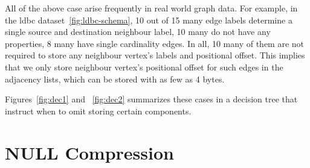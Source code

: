 All of the above case arise frequently in real world graph data. For example, in the \gls{ldbc} dataset~\ref{fig:ldbc-schema}, 10  out of 15 many edge labels determine a single source and destination neighbour label, 10 many do not have any properties, 8 many have single cardinality edges. In all, 10 many of them are not required to store any neighbour vertex's labels and positional offset. This implies that we only store neighbour vertex's positional offset for such edges in the adjacency lists, which can be stored with as few as 4 bytes.

Figures~\ref{fig:dec1} and ~\ref{fig:dec2} summarizes these cases in a decision tree that instruct when to omit storing certain components.



\section{NULL Compression}
\label{sec:null}

